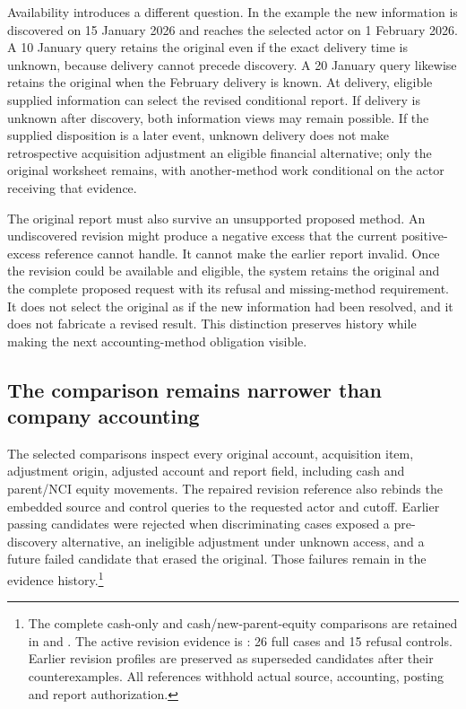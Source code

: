 Availability introduces a different question. In the example the new information is discovered on 15 January 2026 and reaches the selected actor on 1 February 2026. A 10 January query retains the original even if the exact delivery time is unknown, because delivery cannot precede discovery. A 20 January query likewise retains the original when the February delivery is known. At delivery, eligible supplied information can select the revised conditional report. If delivery is unknown after discovery, both information views may remain possible. If the supplied disposition is a later event, unknown delivery does not make retrospective acquisition adjustment an eligible financial alternative; only the original worksheet remains, with another-method work conditional on the actor receiving that evidence.

The original report must also survive an unsupported proposed method. An undiscovered revision might produce a negative excess that the current positive-excess reference cannot handle. It cannot make the earlier report invalid. Once the revision could be available and eligible, the system retains the original and the complete proposed request with its refusal and missing-method requirement. It does not select the original as if the new information had been resolved, and it does not fabricate a revised result. This distinction preserves history while making the next accounting-method obligation visible.

\subsection{The comparison remains narrower than company accounting}

The selected comparisons inspect every original account, acquisition item, adjustment origin, adjusted account and report field, including cash and parent/NCI equity movements. The repaired revision reference also rebinds the embedded source and control queries to the requested actor and cutoff. Earlier passing candidates were rejected when discriminating cases exposed a pre-discovery alternative, an ineligible adjustment under unknown access, and a future failed candidate that erased the original. Those failures remain in the evidence history.\footnote{The complete cash-only and cash/new-parent-equity comparisons are retained in  and . The active revision evidence is : 26 full cases and 15 refusal controls. Earlier revision profiles are preserved as superseded candidates after their counterexamples. All references withhold actual source, accounting, posting and report authorization.}

